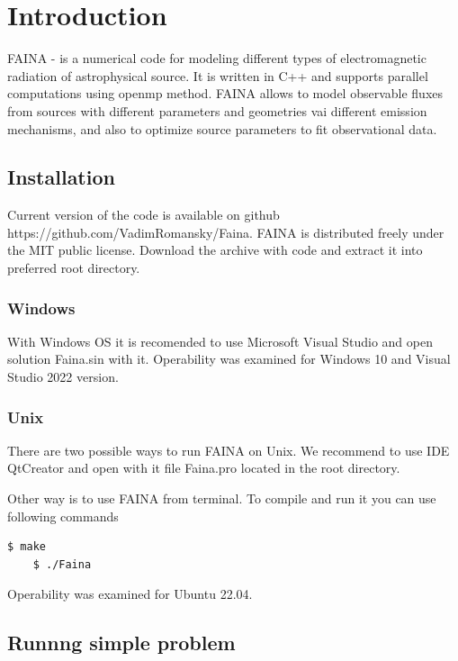 \chapter*{Introduction}		
FAINA - is a numerical code for modeling different types of electromagnetic radiation of astrophysical source. It is written in C++ and supports parallel computations using openmp method. FAINA allows to model observable fluxes from sources with different parameters and geometries vai different emission mechanisms, and also to optimize source parameters to fit observational data.

\section*{Installation}
Current version of the code is available on github https://github.com/VadimRomansky/Faina. FAINA is distributed freely under the MIT public license. Download the archive with code and extract it into preferred root directory.

\subsection*{Windows}
With Windows OS it is recomended to use Microsoft Visual Studio and open solution Faina.sin with it. Operability was examined for Windows 10 and Visual Studio 2022 version.

\subsection*{Unix}
There are two possible ways to run FAINA on Unix. We recommend to use IDE QtCreator and open  with it file Faina.pro located in the root directory.

Other way is to use FAINA from terminal. To compile and run it you can use following commands

\begin{lstlisting}[language=bash]
	$ make
	$ ./Faina
\end{lstlisting}

Operability was examined for Ubuntu 22.04.

\section*{Runnng simple problem}\label{quickStart}

